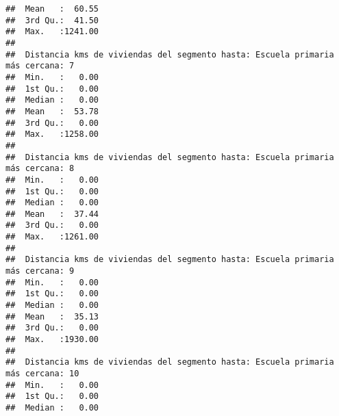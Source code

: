\documentclass[11pt,]{article}
\begin{document}
\begin{verbatim}
##  Mean   :  60.55                                                               
##  3rd Qu.:  41.50                                                               
##  Max.   :1241.00                                                               
##                                                                                
##  Distancia kms de viviendas del segmento hasta: Escuela primaria más cercana: 7
##  Min.   :   0.00                                                               
##  1st Qu.:   0.00                                                               
##  Median :   0.00                                                               
##  Mean   :  53.78                                                               
##  3rd Qu.:   0.00                                                               
##  Max.   :1258.00                                                               
##                                                                                
##  Distancia kms de viviendas del segmento hasta: Escuela primaria más cercana: 8
##  Min.   :   0.00                                                               
##  1st Qu.:   0.00                                                               
##  Median :   0.00                                                               
##  Mean   :  37.44                                                               
##  3rd Qu.:   0.00                                                               
##  Max.   :1261.00                                                               
##                                                                                
##  Distancia kms de viviendas del segmento hasta: Escuela primaria más cercana: 9
##  Min.   :   0.00                                                               
##  1st Qu.:   0.00                                                               
##  Median :   0.00                                                               
##  Mean   :  35.13                                                               
##  3rd Qu.:   0.00                                                               
##  Max.   :1930.00                                                               
##                                                                                
##  Distancia kms de viviendas del segmento hasta: Escuela primaria más cercana: 10
##  Min.   :   0.00                                                                
##  1st Qu.:   0.00                                                                
##  Median :   0.00                                                                

\end{verbatim}
\end{document}
